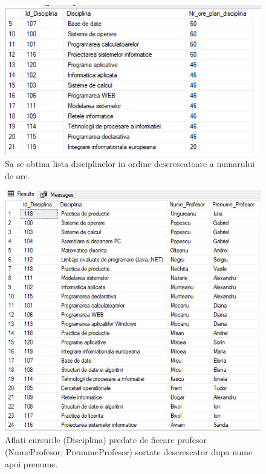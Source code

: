 \documentclass[12pt]{article}
\begin{document}
        \begin{figure}[H]
                \centering
                \includegraphics[width=.95\textwidth]{img2.png}
                \caption{Sa se obtina lista disciplinelor in ordine descrescatoare a numarului de ore.}
        \end{figure}
        \vspace{0.5 cm}

        
        \begin{figure}[H]
                \centering
                \includegraphics[width=1\textwidth]{img3.png}
                \caption{Aflati cursurile (Disciplina) predate de fiecare profesor (NumeProfesor, PrenumeProfesor) sortate descrescator dupa nume apoi prenume.}
        \end{figure}
        \vspace{0.5 cm}
\end{document}
